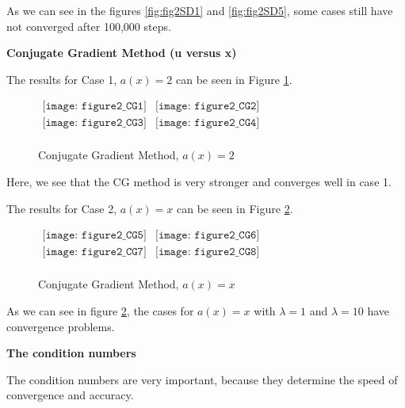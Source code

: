 As we can see in the figures \ref{fig:fig2SD1} and \ref{fig:fig2SD5}, some cases still have not converged after 100,000 steps.


\clearpage
{\Large \textbf{Conjugate Gradient Method (u versus x)}}

The results for Case 1, $a(x)=2$ can be seen in Figure \ref{fig:fig2CG1}.

\begin{figure}[H]
    \centering
    $\begin{array}{cc}
        \texttt{[image: figure2\_CG1]} &
        \texttt{[image: figure2\_CG2]} \\
        \texttt{[image: figure2\_CG3]} &
        \texttt{[image: figure2\_CG4]} \\
    \end{array}$
    \caption{Conjugate Gradient Method, $a(x)=2$}
    \label{fig:fig2CG1}
\end{figure}

Here, we see that the CG method is very stronger and converges well in case 1.

\clearpage
The results for Case 2, $a(x)=x$ can be seen in Figure \ref{fig:fig2CG5}.

\begin{figure}[H]
    \centering
    $\begin{array}{cc}
        \texttt{[image: figure2\_CG5]} &
        \texttt{[image: figure2\_CG6]} \\
        \texttt{[image: figure2\_CG7]} &
        \texttt{[image: figure2\_CG8]} \\
    \end{array}$
    \caption{Conjugate Gradient Method, $a(x)=x$}
    \label{fig:fig2CG5}
\end{figure}

As we can see in figure \ref{fig:fig2CG5}, the cases for $a(x)=x$ with $\lambda=1$ and $\lambda=10$ have convergence problems.

\clearpage
{\Large \textbf{The condition numbers}}

The condition numbers are very important, because they determine the speed of convergence and accuracy.

